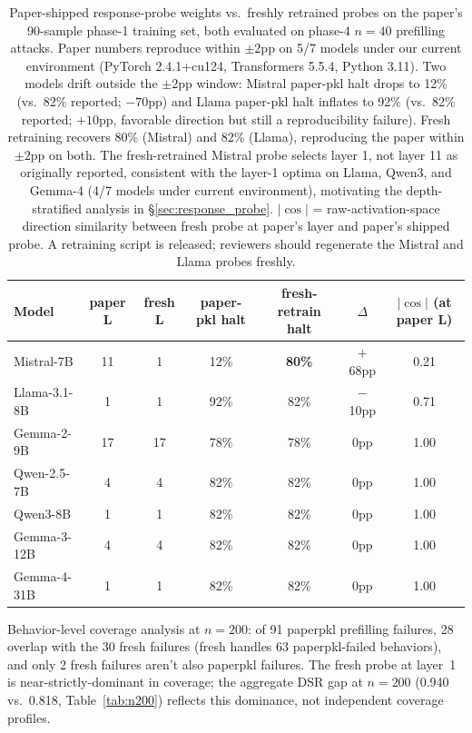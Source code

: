 \documentclass{article}
\begin{document}
\begin{table}[H]
\centering
\small
\caption{Paper-shipped response-probe weights vs.\ freshly retrained probes on the paper's 90-sample phase-1 training set, both evaluated on phase-4 $n=40$ prefilling attacks. Paper numbers reproduce within $\pm 2$pp on 5/7 models under our current environment (PyTorch 2.4.1+cu124, Transformers 5.5.4, Python 3.11). Two models drift outside the $\pm 2$pp window: Mistral paper-pkl halt drops to 12\% (vs.\ 82\% reported; $-70$pp) and Llama paper-pkl halt inflates to 92\% (vs.\ 82\% reported; $+10$pp, favorable direction but still a reproducibility failure). Fresh retraining recovers 80\% (Mistral) and 82\% (Llama), reproducing the paper within $\pm 2$pp on both. The fresh-retrained Mistral probe selects layer 1, not layer 11 as originally reported, consistent with the layer-1 optima on Llama, Qwen3, and Gemma-4 (4/7 models under current environment), motivating the depth-stratified analysis in \S\ref{sec:response_probe}. $|\cos|$ = raw-activation-space direction similarity between fresh probe at paper's layer and paper's shipped probe. A retraining script is released; reviewers should regenerate the Mistral and Llama probes freshly.}
\label{tab:probe_reproducibility}
\begin{tabular}{lcccccc}
\toprule
\textbf{Model} & \textbf{paper L} & \textbf{fresh L} & \textbf{paper-pkl halt} & \textbf{fresh-retrain halt} & \textbf{$\Delta$} & $|\cos|$ (at paper L) \\
\midrule
Mistral-7B     & 11 & 1  & 12\% & \textbf{80\%} & $+$68pp & 0.21 \\
Llama-3.1-8B   & 1  & 1  & 92\% & 82\%          & $-$10pp & 0.71 \\
Gemma-2-9B     & 17 & 17 & 78\% & 78\%          & $0$pp   & 1.00 \\
Qwen-2.5-7B    & 4  & 4  & 82\% & 82\%          & $0$pp   & 1.00 \\
Qwen3-8B       & 1  & 1  & 82\% & 82\%          & $0$pp   & 1.00 \\
Gemma-3-12B    & 4  & 4  & 82\% & 82\%          & $0$pp   & 1.00 \\
Gemma-4-31B    & 1  & 1  & 82\% & 82\%          & $0$pp   & 1.00 \\
\bottomrule
\end{tabular}
\end{table}

Behavior-level coverage analysis at $n=200$: of 91 paperpkl prefilling failures, 28 overlap with the 30 fresh failures (fresh handles 63 paperpkl-failed behaviors), and only 2 fresh failures aren't also paperpkl failures. The fresh probe at layer~1 is near-strictly-dominant in coverage; the aggregate DSR gap at $n=200$ (0.940 vs.\ 0.818, Table~\ref{tab:n200}) reflects this dominance, not independent coverage profiles.
\end{document}
